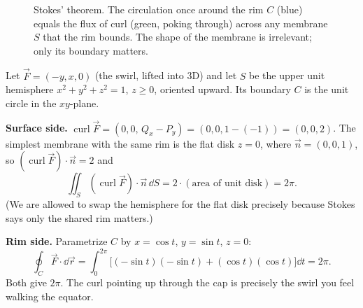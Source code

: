 \begin{figure}[H]
\centering
{}
\caption{Stokes' theorem. The circulation once around the rim $C$ (blue) equals the
flux of curl (green, poking through) across any membrane $S$ that the rim bounds.
The shape of the membrane is irrelevant; only its boundary matters.}
\label{ch35:fig-stokes}
\end{figure}

\begin{example}
\label{ch35:ex-stokes}
Let $\vec F=(-y,x,0)$ (the swirl, lifted into 3D) and let $S$ be the upper unit
hemisphere $x^2+y^2+z^2=1$, $z\ge0$, oriented upward. Its boundary $C$ is the unit
circle in the $xy$-plane.

\textbf{Surface side.}
$\operatorname{curl}\vec F = (0,0,\,Q_x-P_y)=(0,0,1-(-1))=(0,0,2)$.
The simplest membrane with the same rim is the flat disk $z=0$, where
$\vec n=(0,0,1)$, so $(\operatorname{curl}\vec F)\cdot\vec n = 2$ and
\[
  \iint_S (\operatorname{curl}\vec F)\cdot\vec n\,\dd S = 2\cdot(\text{area of unit disk}) = 2\pi.
\]
(We are allowed to swap the hemisphere for the flat disk precisely because Stokes
says only the shared rim matters.)

\textbf{Rim side.} Parametrize $C$ by $x=\cos t$, $y=\sin t$, $z=0$:
\[
  \oint_C \vec F\cdot\dd\vec r = \int_0^{2\pi}\big[(-\sin t)(-\sin t)+(\cos t)(\cos t)\big]\dd t = 2\pi.
\]
Both give $2\pi$. The curl pointing up through the cap is precisely the swirl you
feel walking the equator.
\end{example}

